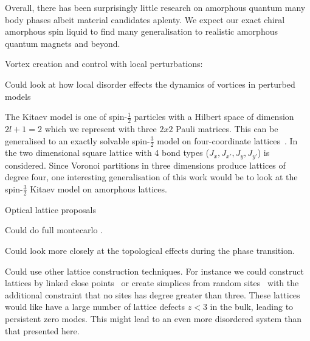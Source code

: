 Overall, there has been surprisingly little research on amorphous quantum many body phases albeit material candidates aplenty. We expect our exact chiral amorphous spin liquid to find many generalisation to realistic amorphous quantum magnets and beyond.

Vortex creation and control with local perturbations:~\autocite{jangVortexCreationControl2021}

Could look at how local disorder effects the dynamics of vortices in perturbed models~\autocite{joyDynamicsVisonsThermal2022}

The Kitaev model is one of spin-\(\tfrac{1}{2}\) particles with a Hilbert space of dimension \(2l + 1 = 2\) which we represent with three \(2x2\) Pauli matrices. This can be generalised to an exactly solvable spin-\(\tfrac{3}{2}\) model on four-coordinate lattices~\autocite{yaoAlgebraicSpinLiquid2009,wenQuantumOrderStringnet2003}. In~\autocite{yaoAlgebraicSpinLiquid2009} the two dimensional square lattice with 4 bond types (\(J_x, J_{x'},J_y, J_{y'}\)) is considered. Since Voronoi partitions in three dimensions produce lattices of degree four, one interesting generalisation of this work would be to look at the spin-\(\tfrac{3}{2}\) Kitaev model on amorphous lattices.

Optical lattice proposals~\autocite{duanControllingSpinExchange2003,micheliToolboxLatticespinModels2006}

Could do full montecarlo .

Could look more closely at the topological effects during the phase transition.

Could use other lattice construction techniques. For instance we could construct lattices by linked close points~\autocite{agarwala2019topological} or create simplices from random sites~\autocite{christRandomLatticeField1982} with the additional constraint that no sites has degree greater than three. These lattices would like have a large number of lattice defects \(z < 3\) in the bulk, leading to persistent zero modes. This might lead to an even more disordered system than that presented here.
